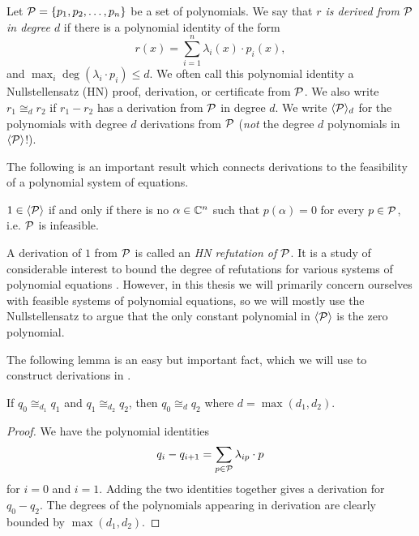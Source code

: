 \begin{definition}
Let $\mathcal P = \{p_1, p_2, \dots, p_n\}$ be a set of polynomials. We say that \emph{$r$ is derived from $\mathcal P$ in degree $d$} if there is a polynomial identity of the form
\[r(x) = \sum_{i=1}^n \lambda_i(x) \cdot p_i(x),\]
and $\max_i \deg(\lambda_i \cdot p_i) \leq d$. We often call this polynomial identity a Nullstellensatz (HN) proof, derivation, or certificate from $\mathcal P$. We also write $r_1 \cong_d r_2$ if $r_1 - r_2$ has a derivation from $\mathcal P$ in degree $d$. We write $\langle \mathcal P \rangle_d$ for the polynomials with degree $d$ derivations from $\mathcal P$ (\emph{not} the degree $d$ polynomials in $\langle \mathcal P \rangle$!).
\end{definition}

The following is an important result which connects derivations to the feasibility of a polynomial system of equations.
\begin{lemma}\label{lem:nullstellensatz}
$1 \in \langle \mathcal P \rangle$ if and only if there is no $\alpha \in \mathbb C^n$ such that $p(\alpha) = 0$ for every $p \in \mathcal P$, i.e. $\mathcal P$ is infeasible.
\end{lemma}
A derivation of $1$ from $\mathcal P$ is called an \emph{HN refutation of $\mathcal P$}.
It is a study of considerable interest to bound the degree of refutations for various systems of polynomial equations \cite{BIKPP94,BT98,Gri98,BGIP01}.
However, in this thesis we will primarily concern ourselves with feasible systems of polynomial equations, so we will mostly use the Nullstellensatz to argue that the only constant polynomial in $\langle \mathcal P \rangle$ is the zero polynomial. 

The following lemma is an easy but important fact, which we will use to construct derivations in .
\begin{lemma}\label{lem:derivation-chain}
If $q_0 \cong_{d_1} q_1$ and $q_1 \cong_{d_2} q_2$, then $q_0 \cong_d q_2$ where $d = \max(d_1, d_2)$.
\end{lemma}
\begin{proof}
We have the polynomial identities
\[q_i - q_{i+1} = \sum_{p \in \mathcal P} \lambda_{ip} \cdot p\]
for $i = 0$ and $i = 1$. Adding the two identities together gives a derivation for $q_0 - q_2$. The degrees of the polynomials appearing in derivation are clearly bounded by $\max(d_1,d_2)$. 
\end{proof}


